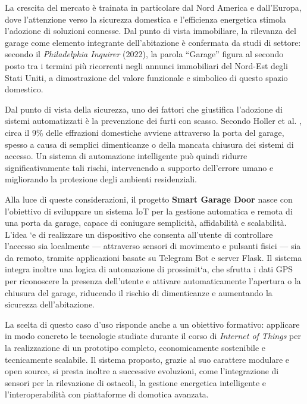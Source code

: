 La crescita del mercato è trainata in particolare dal Nord America e dall’Europa, dove l’attenzione verso la sicurezza domestica e l’efficienza energetica stimola l’adozione di soluzioni connesse.  
Dal punto di vista immobiliare, la rilevanza del garage come elemento integrante dell’abitazione è confermata da studi di settore: secondo il \textit{Philadelphia Inquirer} (2022), la parola “Garage” figura al secondo posto tra i termini più ricorrenti negli annunci immobiliari del Nord-Est degli Stati Uniti, a dimostrazione del valore funzionale e simbolico di questo spazio domestico.

Dal punto di vista della sicurezza, uno dei fattori che giustifica l’adozione di sistemi automatizzati è la prevenzione dei furti con scasso.  
Secondo Holler et al. \cite{Holler2014}, circa il 9\% delle effrazioni domestiche avviene attraverso la porta del garage, spesso a causa di semplici dimenticanze o della mancata chiusura dei sistemi di accesso.  
Un sistema di automazione intelligente può quindi ridurre significativamente tali rischi, intervenendo a supporto dell’errore umano e migliorando la protezione degli ambienti residenziali.

Alla luce di queste considerazioni, il progetto \textbf{Smart Garage Door} nasce con l’obiettivo di sviluppare un sistema IoT per la gestione automatica e remota di una porta da garage, capace di coniugare semplicità, affidabilità e scalabilità.  
L’idea `e di realizzare un dispositivo
che consenta all’utente di controllare l’accesso sia localmente — attraverso sensori di movimento
e pulsanti fisici — sia da remoto, tramite applicazioni basate su Telegram Bot e server Flask.
Il sistema integra inoltre una logica di automazione di prossimit`a, che sfrutta i dati GPS
per riconoscere la presenza dell’utente e attivare automaticamente l’apertura o la chiusura del
garage, riducendo il rischio di dimenticanze e aumentando la sicurezza dell’abitazione.

La scelta di questo caso d’uso risponde anche a un obiettivo formativo: applicare in modo concreto le tecnologie studiate durante il corso di \textit{Internet of Things} per la realizzazione di un prototipo completo, economicamente sostenibile e tecnicamente scalabile.  
Il sistema proposto, grazie al suo carattere modulare e open source, si presta inoltre a successive evoluzioni, come l’integrazione di sensori per la rilevazione di ostacoli, la gestione energetica intelligente e l’interoperabilità con piattaforme di domotica avanzata.


